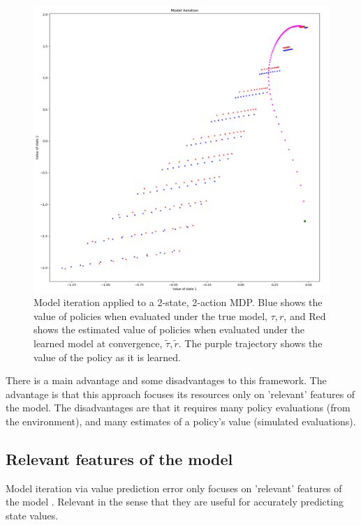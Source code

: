\begin{figure}
\centering
\includegraphics[width=1.0\textwidth,height=0.8\textheight]{../../pictures/figures/model_iteration.png}
\caption{Model iteration applied to a 2-state, 2-action MDP.
Blue shows the value of policies when evaluated under the true model, $\tau, r$,
and Red shows the estimated value of policies when evaluated under the learned model at convergence, $\tilde \tau, \tilde r$.
The purple trajectory shows the value of the policy as it is learned.}
\end{figure}

There is a main advantage and some disadvantages to this framework.
The advantage is that this approach focuses its resources only on 'relevant' features of the model.
The disadvantages are that it requires many policy evaluations (from the environment),
and many estimates of a policy's value (simulated evaluations).

\subsection{Relevant features of the model}

Model iteration via value prediction error only focuses on 'relevant' features of the model \footnotemark.
Relevant in the sense that they are useful for accurately predicting state values.

